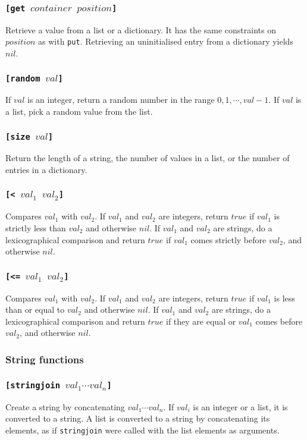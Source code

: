 \documentclass[11pt]{report}
\begin{document}
\subsubsection*{\tt{[get }$container$ $position$\tt{]}}
Retrieve a value from a list or a dictionary. It has the same constraints on $position$ as with \verb|put|. Retrieving an uninitialised entry from a dictionary yields $nil$.
\subsubsection*{\tt{[random }$val$\tt{]}}
If $val$ is an integer, return a random number in the range $0,1, \cdots, val -1$. If $val$ is a list, pick a random value from the list.
\subsubsection*{\tt{[size }$val$\tt{]}}
Return the length of a string, the number of values in a list, or the number of entries in a dictionary.
\subsubsection*{\tt{[< }$val_1$ $val_2$\tt{]}}
Compares $val_1$ with $val_2$. If $val_1$ and $val_2$ are integers, return $true$ if $val_1$ is strictly less than $val_2$ and otherwise $nil$.
If $val_1$ and $val_2$ are strings, do a lexicographical comparison and return $true$ if $val_1$ comes strictly before $val_2$, and otherwise $nil$.
\subsubsection*{\tt{[<= }$val_1$ $val_2$\tt{]}}
Compares $val_1$ with $val_2$. If $val_1$ and $val_2$ are integers, return $true$ if $val_1$ is less than or equal to $val_2$ and otherwise $nil$.
If $val_1$ and $val_2$ are strings, do a lexicographical comparison and return $true$ if they are equal or $val_1$ comes before $val_2$, and otherwise $nil$.

\subsubsection{String functions}
\subsubsection*{\tt{[stringjoin }$val_1\cdots val_n$\tt{]}}
Create a string by concatenating $val_1\cdots val_n$.
If $val_i$ is an integer or a list, it is converted to a string.
A list is converted to a string by concatenating its elements, as if {\tt stringjoin} were called with the list elements as arguments.
\end{document}
